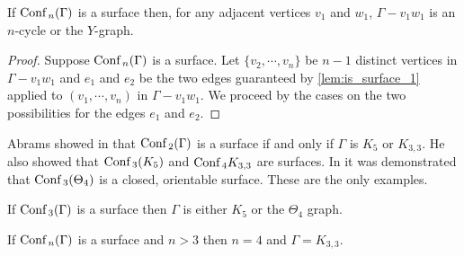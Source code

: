 \begin{lem}
If \(\text{Conf}\,_n(\Gamma)\) is a surface then,
for any adjacent vertices \(v_1\) and \(w_1\), \(\Gamma - v_1 w_1\) is an \(n\)-cycle or the \(Y\)-graph.
\end{lem}
\begin{proof}
    Suppose \(\text{Conf}\,_n(\Gamma)\) is a surface.
    Let \(\{v_2, \cdots, v_n\}\) be \(n-1\) distinct vertices in \(\Gamma - v_1 w_1\)
    and \(e_1\) and \(e_2\) be the two edges guaranteed by \ref{lem:is_surface_1} applied to \((v_1, \cdots, v_n)\) in \(\Gamma - v_1 w_1\).
    We proceed by the cases on the two possibilities for the edges \(e_1\) and \(e_2\).

\end{proof}


Abrams showed in \cite{abrams2000configurationspaces} that \(\text{Conf}\,_2(\Gamma)\) is a surface if and only if \(\Gamma\) is \(K_5\) or \(K_{3,3}\).
He also showed that \(\text{Conf}\,_3(K_5)\) and \(\text{Conf}\,_4{K_{3,3}}\) are surfaces.
In \cite{appiah2024algebraicstructurehyperbolicgraph} it was demonstrated that \(\text{Conf}\,_3(\Theta_4)\) is a closed, orientable surface.
These are the only examples.

\begin{thm}
    If \(\text{Conf}\,_3(\Gamma)\) is a surface then \(\Gamma\) is either \(K_5\) or the \(\Theta_4\) graph.
\end{thm}

\begin{thm}
    If \(\text{Conf}\,_n(\Gamma)\) is a surface and \(n > 3\) then \(n = 4\) and \(\Gamma = K_{3,3}\).
\end{thm}
